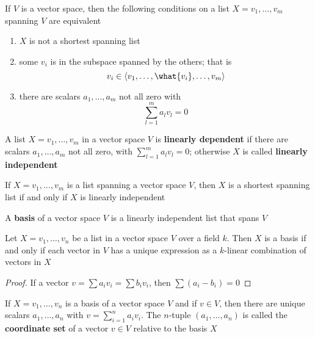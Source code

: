 \documentclass[11pt]{article}
\begin{document}
\begin{proposition}[]
\label{prop3.73}
If \(V\) is a vector space, then the following conditions on a list
\(X=v_1,\dots,v_m\) spanning \(V\) are equivalent
\begin{enumerate}
\item \(X\) is not a shortest spanning list
\item some \(v_i\) is in the subspace spanned by the others; that is
\begin{equation*}
v_i\in\la v_1,\dots,\what{v_i},\dots,v_m\ra
\end{equation*}
\item there are scalars \(a_1,\dots,a_m\) not all zero with
\begin{equation*}
\displaystyle\sum_{l=1}^ma_lv_l=0
\end{equation*}
\end{enumerate}
\end{proposition}


\begin{definition}[]
A list \(X=v_1,\dots,v_m\) in a vector space \(V\) is \textbf{linearly dependent} if
there are scalars \(a_1,\dots,a_m\) not all zero, with
\(\sum_{l=1}^ma_lv_l=0\); otherwise \(X\) is called \textbf{linearly independent}
\end{definition}


\begin{corollary}[]
If \(X=v_1,\dots,v_m\) is a list spanning a vector space \(V\), then \(X\) is a
shortest spanning list if and only if \(X\) is linearly independent
\end{corollary}


\begin{definition}[]
A \textbf{basis} of a vector space \(V\) is a linearly independent list that spans \(V\)
\end{definition}

\begin{proposition}[]
Let \(X=v_1,\dots,v_n\) be a list in a vector space \(V\) over a field \(k\).
Then \(X\) is a basis if and only if each vector in \(V\) has a unique
expression as a \(k\)-linear combination of vectors in \(X\)
\end{proposition}

\begin{proof}
If a vector \(v=\sum a_iv_i=\sum b_iv_i\), then \(\sum(a_i-b_i)=0\)
\end{proof}

\begin{definition}[]
If \(X=v_1,\dots,v_n\) is a basis of a vector space \(V\) and if \(v\in V\),
then there are unique scalars \(a_1,\dots,a_n\) with
\(v=\sum_{i=1}^na_iv_i\). The \(n\)-tuple \((a_1,\dots,a_n)\) is called the
\textbf{coordinate set} of a vector \(v\in V\) relative to the basis \(X\)
\end{definition}
\end{document}
